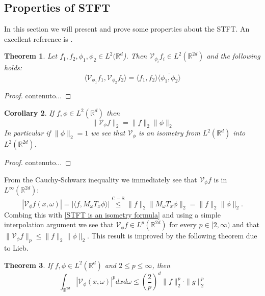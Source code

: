 \documentclass[corpo=11pt, stile=classica, tipotesi=custom,
greek, evenboxes, english]{toptesi}
\numberwithin{equation}{chapter}
\newtheorem{teo}{Theorem}[chapter] %
\newtheorem{cor}[teo]{Corollary}
\newcommand{\R}{\mathbb{R}} %
\newcommand{\V}{\mathcal{V}} %
\begin{document}
\subsection{Properties of STFT}
In this section we will present and prove some properties about the STFT. An excellent reference is \cite{grochenig}.
\begin{teo}\label{orthogonality relations theorem}
	Let $f_1,f_2,\phi_1,\phi_2 \in L^2(\R^d$). Then $\V_{\phi_i}f_i \in L^2(\R^{2d})$ and the following holds:
	\begin{equation}\label{orthogonality relation formula}
		\langle \V_{\phi_1} f_1, \V_{\phi_2} f_2 \rangle = \langle f_1, f_2 \rangle \overline{\langle \phi_1, \phi_2 \rangle}
	\end{equation}
\end{teo}
\begin{proof}
	contenuto...
\end{proof}
\begin{cor}
	If $f, \phi \in L^2(\R^d)$ then
	\begin{equation}\label{STFT is an isometry formula}
		\| \V_{\phi} f\|_2 = \| f \|_2 \| \phi \|_2
	\end{equation} 
	In particular if $\| \phi \|_2 = 1$ we see that $\V_{\phi}$ is an isometry from $L^2(\R^d)$ into $L^2(\R^{2d})$.
\end{cor}
\begin{proof}
	contenuto...
\end{proof}
From the Cauchy-Schwarz inequality we immediately see that $\V_{\phi} f$ is in $L^{\infty}(\R^{2d})$:
\begin{equation}\label{STFT is bounded}
	|\V_{\phi} f(x,\omega)| = |\langle f, M_{\omega} T_x \phi\rangle| \overset{\mathrm{C-S}}{\leq} \|f\|_2 \|M_{\omega}T_x \phi\|_2 = \|f\|_2 \|\phi\|_2.
\end{equation}
Combing this with \eqref{STFT is an isometry formula} and using a simple interpolation argument we see that $\V_{\phi}f \in L^p(\R^{2d})$ for every $p \in [2,\infty)$ and that $\|\V_{\phi}f\|_p \leq \|f\|_2 \|\phi\|_2$. This result is improved by the following theorem due to Lieb.
\begin{teo}\label{Lieb's inequality}
	If $f,\phi \in L^2(\R^d)$ and $2 \leq p \leq \infty$, then
	\begin{equation}\label{Lieb's inequality formula}
		\int_{\R^{2d}} |\V_{\phi}(x,\omega)|^p dxd\omega \leq \left(\dfrac{2}{p}\right)^d \|f\|_2^p \cdot \|g\|_2^p
	\end{equation}
\end{teo}
\end{document}
